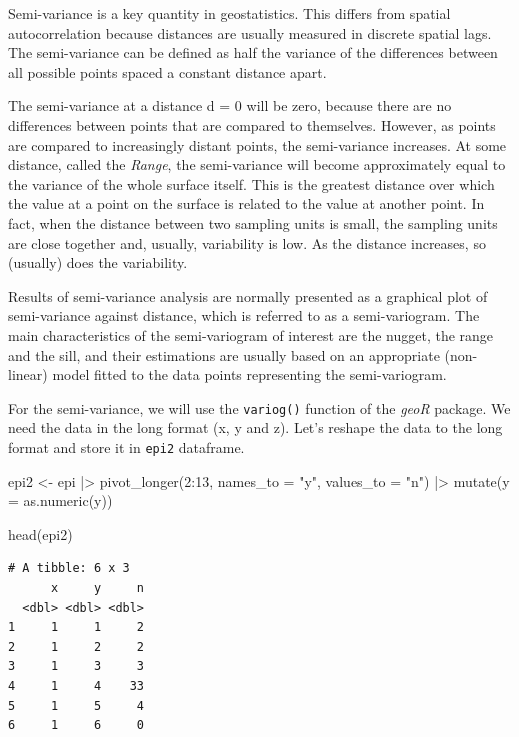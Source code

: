 \documentclass[
  letterpaper,
]{book}
\newenvironment{Shaded}{\begin{snugshade}}{\end{snugshade}}
\newcommand{\AttributeTok}[1]{\textcolor[rgb]{0.40,0.45,0.13}{#1}}
\newcommand{\DecValTok}[1]{\textcolor[rgb]{0.68,0.00,0.00}{#1}}
\newcommand{\FunctionTok}[1]{\textcolor[rgb]{0.28,0.35,0.67}{#1}}
\newcommand{\NormalTok}[1]{\textcolor[rgb]{0.00,0.23,0.31}{#1}}
\newcommand{\OtherTok}[1]{\textcolor[rgb]{0.00,0.23,0.31}{#1}}
\newcommand{\SpecialCharTok}[1]{\textcolor[rgb]{0.37,0.37,0.37}{#1}}
\newcommand{\StringTok}[1]{\textcolor[rgb]{0.13,0.47,0.30}{#1}}
\begin{document}
Semi-variance is a key quantity in geostatistics. This differs from
spatial autocorrelation because distances are usually measured in
discrete spatial lags. The semi-variance can be defined as half the
variance of the differences between all possible points spaced a
constant distance apart.

The semi-variance at a distance d = 0 will be zero, because there are no
differences between points that are compared to themselves. However, as
points are compared to increasingly distant points, the semi-variance
increases. At some distance, called the \emph{Range}, the semi-variance
will become approximately equal to the variance of the whole surface
itself. This is the greatest distance over which the value at a point on
the surface is related to the value at another point. In fact, when the
distance between two sampling units is small, the sampling units are
close together and, usually, variability is low. As the distance
increases, so (usually) does the variability.

Results of semi-variance analysis are normally presented as a graphical
plot of semi-variance against distance, which is referred to as a
semi-variogram. The main characteristics of the semi-variogram of
interest are the nugget, the range and the sill, and their estimations
are usually based on an appropriate (non-linear) model fitted to the
data points representing the semi-variogram.

For the semi-variance, we will use the \texttt{variog()} function of the
\emph{geoR} package. We need the data in the long format (x, y and z).
Let's reshape the data to the long format and store it in \texttt{epi2}
dataframe.

\begin{Shaded}
\begin{Highlighting}[]
\NormalTok{epi2 }\OtherTok{\textless{}{-}}\NormalTok{ epi }\SpecialCharTok{|\textgreater{}}
  \FunctionTok{pivot\_longer}\NormalTok{(}\DecValTok{2}\SpecialCharTok{:}\DecValTok{13}\NormalTok{,}
               \AttributeTok{names\_to =} \StringTok{"y"}\NormalTok{,}
               \AttributeTok{values\_to =} \StringTok{"n"}\NormalTok{) }\SpecialCharTok{|\textgreater{}}
  \FunctionTok{mutate}\NormalTok{(}\AttributeTok{y =} \FunctionTok{as.numeric}\NormalTok{(y))}

\FunctionTok{head}\NormalTok{(epi2)}
\end{Highlighting}
\end{Shaded}

\begin{verbatim}
# A tibble: 6 x 3
      x     y     n
  <dbl> <dbl> <dbl>
1     1     1     2
2     1     2     2
3     1     3     3
4     1     4    33
5     1     5     4
6     1     6     0
\end{verbatim}
\end{document}
